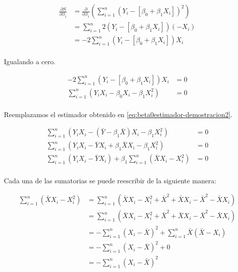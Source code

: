 \documentclass[
  11pt,
]{book}
\theoremstyle{definition}
\theoremstyle{definition}
\theoremstyle{definition}
\theoremstyle{definition}
\theoremstyle{remark}
\begin{document}
\begin{equation}
\begin{split}
\frac{\partial S}{\partial\beta_1} &= \frac{\partial }{\partial\beta_1}\left(\sum_{i=1}^n (Y_i - [\beta_0 + \beta_1X_i])^2\right)\\
&= \sum_{i=1}^n 2(Y_i - [\beta_0 + \beta_1X_i])(-X_i)\\
&= -2\sum_{i=1}^n (Y_i - [\beta_0 + \beta_1X_i])X_i\\
\end{split}
\label{eq:beta1estimador-demostracion1}
\end{equation}

Igualando a cero.

\begin{equation}
\begin{split}
-2\sum_{i=1}^n (Y_i - [\beta_0 + \beta_1X_i])X_i &= 0\\
\sum_{i=1}^n (Y_iX_i - \beta_0X_i - \beta_1X_i^2) &= 0\\
\end{split}
\label{eq:beta1estimador-demostracion2}
\end{equation}

Reemplazamos el estimador obtenido en \eqref{eq:beta0estimador-demostracion2}.

\begin{equation}
\begin{split}
\sum_{i=1}^n (Y_iX_i - (\bar{Y} - \beta_1\bar{X})X_i - \beta_1X_i^2) &= 0\\
\sum_{i=1}^n (Y_iX_i - \bar{Y}X_i + \beta_1\bar{X}X_i - \beta_1X_i^2) &= 0\\
\sum_{i=1}^n (Y_iX_i - \bar{Y}X_i) + \beta_1\sum_{i=1}^n(\bar{X}X_i - X_i^2) &= 0\\
\end{split}
\label{eq:beta1estimador-demostracion3}
\end{equation}

Cada una de las sumatorias se puede reescribir de la siguiente manera:

\begin{equation}
\begin{split}
\sum_{i=1}^n(\bar{X}X_i - X_i^2) &= \sum_{i=1}^n(\bar{X}X_i - X_i^2 + \bar{X}^2 + \bar{X}X_i - \bar{X}^2 - \bar{X}X_i)\\
&= \sum_{i=1}^n(\bar{X}X_i - X_i^2 + \bar{X}^2 + \bar{X}X_i - \bar{X}^2 - \bar{X}X_i)\\
&= -\sum_{i=1}^n(X_i -\bar{X})^2 + \sum_{i=1}^n\bar{X}(\bar{X}-X_i)\\
&= -\sum_{i=1}^n(X_i -\bar{X})^2 + 0\\
&= -\sum_{i=1}^n(X_i -\bar{X})^2\\
\end{split}
\label{eq:beta1estimador-demostracion4}
\end{equation}
\end{document}
